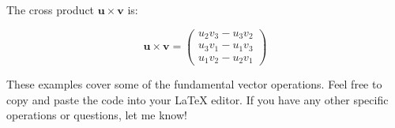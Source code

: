\documentclass{article}
\begin{document}
   The cross product \( \mathbf{u} \times \mathbf{v} \) is:

   \[
   \mathbf{u} \times \mathbf{v} = \begin{pmatrix}
   u_2 v_3 - u_3 v_2 \\
   u_3 v_1 - u_1 v_3 \\
   u_1 v_2 - u_2 v_1
   \end{pmatrix}
   \]
 
These examples cover some of the fundamental vector operations. Feel free to copy and paste the code into your LaTeX editor. If you have any other specific operations or questions, let me know!
\end{document}
